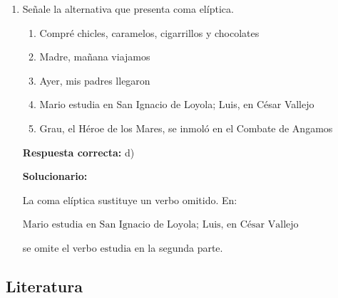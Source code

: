 \begin{enumerate}[resume]
	\vspace{2mm}
	\textbf{Solucionario:}
	
	La unidad mínima con sentido completo, autonomía y estructura sintáctica propia es la \textbf{oración}.
	
	\vspace{6mm}
	
	\item Señale la alternativa que presenta coma elíptica.
	\begin{enumerate}[label=\alph*)]
		\item Compré chicles, caramelos, cigarrillos y chocolates
		\item Madre, mañana viajamos
		\item Ayer, mis padres llegaron
		\item Mario estudia en San Ignacio de Loyola; Luis, en César Vallejo
		\item Grau, el Héroe de los Mares, se inmoló en el Combate de Angamos
	\end{enumerate}
	\textbf{Respuesta correcta:} d)
	
	\vspace{2mm}
	\textbf{Solucionario:}
	
	La coma elíptica sustituye un verbo omitido. En:
	
	$ \text{Mario estudia en San Ignacio de Loyola; Luis, en César Vallejo} $
	
	se omite el verbo $ \text{estudia} $ en la segunda parte.
	
	\vspace{6mm}
\end{enumerate}


\subsection*{Literatura}

